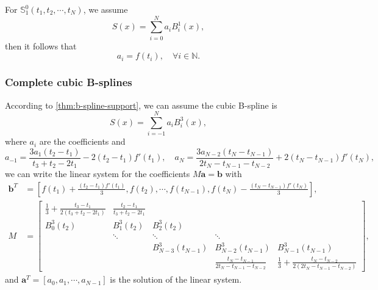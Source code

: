 \documentclass[a4paper]{article}
\theoremstyle{definition}
\begin{document}
For $\mathbb{S}_1^0(t_1, t_2, \cdots, t_N)$, we assume 
\begin{equation}
  S(x) = \sum_{i = 0}^N a_i B_i^1(x),
  \label{eq:linear-b-spline-form}
\end{equation}
then it follows that 
\begin{equation}
  a_i = f(t_i), \quad \forall i \in \mathbb{N}.
  \label{eq:linear-b-spline-coefficients}
\end{equation}

\subsubsection{Complete cubic B-splines}
\label{sec:complete-cubic-b-splines}

According to \cref{thm:b-spline-support}, we can assume the cubic B-spline is 
\begin{equation}
  S(x) = \sum_{i = -1}^N a_i B_i^3(x),
  \label{eq:complete-cubic-b-spline}
\end{equation}
where $a_i$ are the coefficients and 
\begin{equation}
  a_{-1} = \frac{3a_1(t_2 - t_1)}{t_3 + t_2 - 2t_1} - 2(t_2 - t_1)f'(t_1),\quad a_N = \frac{3a_{N - 2}(t_N - t_{N - 1})}{2t_N - t_{N - 1} - t_{N - 2}} + 2(t_N - t_{N - 1})f'(t_N),
  \label{eq:complete-cubic-b-spline-coefficients}
\end{equation}
we can write the linear system for the coefficients $M\mathbf{a} = \mathbf{b}$ with
\begin{equation}
  \begin{aligned}
    \mathbf{b}^T &= [f(t_1) + \frac{(t_2 - t_1)f'(t_1)}{3}, f(t_2), \cdots, f(t_{N - 1}), f(t_N) - \frac{(t_N - t_{N - 1})f'(t_N)}{3}], \\
    M &= \begin{bmatrix}
      \frac{1}{3} + \frac{t_3 - t_1}{2(t_3 + t_2 - 2t_1)} & \frac{t_2 - t_1}{t_3 + t_2 - 2t_1} &    &    &    \\
      B_0^3(t_2) & B_1^3(t_2) & B_2^3(t_2) &    &    \\
        & \ddots & \ddots & \ddots &    \\
        &    & B_{N - 3}^3(t_{N - 1}) & B_{N - 2}^3(t_{N - 1}) & B_{N - 1}^3(t_{N - 1}) \\
        &    &    & \frac{t_N - t_{N - 1}}{2t_N - t_{N - 1} - t_{N - 2}} & \frac{1}{3} + \frac{t_N - t_{N - 2}}{2(2t_N - t_{N - 1} - t_{N - 2})}
    \end{bmatrix},
  \end{aligned}
  \label{eq:complete-cubic-b-spline-linear-system}
\end{equation}
and $\mathbf{a}^T = [a_0, a_1, \cdots, a_{N - 1}]$ is the solution of the linear system.
\end{document}
